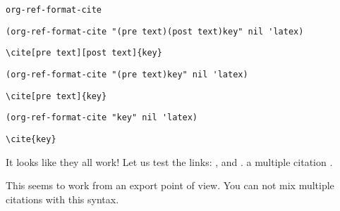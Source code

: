 \documentclass[aps,prb,citeautoscript,preprint,citeautoscript,showkeys]{revtex4-1}
\begin{document}
\begin{verbatim}
org-ref-format-cite
\end{verbatim}

\begin{verbatim}
(org-ref-format-cite "(pre text)(post text)key" nil 'latex)
\end{verbatim}

\begin{verbatim}
\cite[pre text][post text]{key}
\end{verbatim}

\begin{verbatim}
(org-ref-format-cite "(pre text)key" nil 'latex)
\end{verbatim}

\begin{verbatim}
\cite[pre text]{key}
\end{verbatim}

\begin{verbatim}
(org-ref-format-cite "key" nil 'latex)
\end{verbatim}

\begin{verbatim}
\cite{key}
\end{verbatim}

It looks like they all work! Let us test the links: \cite{mehta-2014-ident-poten}, \cite[pre text]{mehta-2014-ident-poten} and \cite[pre text][post text]{biskup-2014-insul-ferrom-films}. a multiple citation \cite{mehta-2014-ident-poten,thompson-2014-co2-react,calle-vallejo-2013-number}.

This seems to work from an export point of view. You can not mix multiple citations with this syntax.



\end{document}
